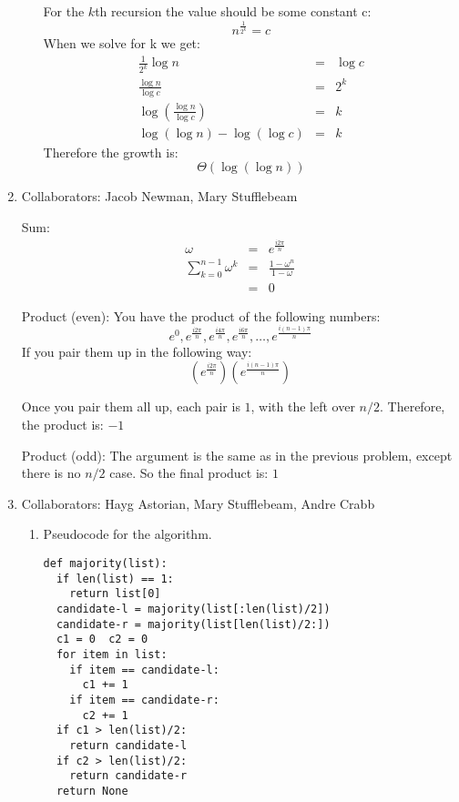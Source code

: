 \documentclass[11pt]{article}
\begin{document}
\begin{enumerate}
\begin{enumerate}
For the $k$th recursion the value should be some constant c:
\begin{equation*}
n^{\frac{1}{2^k}} = c
\end{equation*}
When we solve for k we get:
\begin{eqnarray*}
\frac{1}{2^k} \log n &=& \log c\\
\frac{\log n}{\log c} &=& 2^k\\
\log \left( \frac{\log n}{\log c} \right) &=& k\\
\log (\log n) - \log(\log c) &=&  k
\end{eqnarray*}
Therefore the growth is:
\begin{equation*}
\Theta(\log (\log n))
\end{equation*}
\end{enumerate}

\newpage

\item 
Collaborators: Jacob Newman, Mary Stufflebeam

Sum:
\begin{eqnarray*}
\omega &=& e^{\frac{i2\pi}{n}}\\
\sum_{k=0}^{n-1} \omega^k &=& \frac{1 - \omega^n}{1 - \omega}\\
&=& 0
\end{eqnarray*}

Product (even):
You have the product of the following numbers:
\begin{equation*}
e^{0}, e^{\frac{i2\pi}{n}}, e^{\frac{i4\pi}{n}},
e^{\frac{i6\pi}{n}}, \dots, e^{\frac{i(n-1)\pi}{n}}
\end{equation*}
If you pair them up in the following way:
\begin{equation*}
\left(e^{\frac{i2\pi}{n}}\right)\left(e^{\frac{i(n-1)\pi}{n}}\right)
\end{equation*}

Once you pair them all up, each pair is $1$, with the left over $n/2$.
Therefore, the product is: $-1$

Product (odd):
The argument is the same as in the previous problem, except there is no $n/2$
case. So the final product is: $1$
\newpage

\item

Collaborators: Hayg Astorian, Mary Stufflebeam, Andre Crabb
\begin{enumerate}

\item

Pseudocode for the algorithm. 
\begin{verbatim}
def majority(list):
  if len(list) == 1:
    return list[0]
  candidate-l = majority(list[:len(list)/2])
  candidate-r = majority(list[len(list)/2:])
  c1 = 0  c2 = 0
  for item in list:
    if item == candidate-l:
      c1 += 1
    if item == candidate-r:
      c2 += 1
  if c1 > len(list)/2:
    return candidate-l
  if c2 > len(list)/2:
    return candidate-r
  return None
\end{verbatim}


\end{enumerate}
\end{enumerate}
\end{document}
